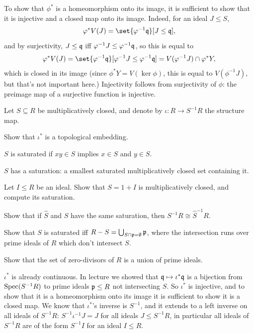     To show that $\phi^*$ is a homeomorphism onto its image, it is sufficient to show that it is injective and a closed map onto its image.
    Indeed, for an ideal $J\leq S$,
    $$ \phi^*V(J) = \set{\phi^{-1}\q}[J\leq\q] , $$
    and by surjectivity, $J\leq{{\frak q}}$ iff $\varphi^{-1}J\leq \varphi^{-1}{{\frak q}}$, so this is equal to
    $$ \phi^*V(J) = \set{\phi^{-1}\q}[\phi^{-1}J\leq\phi^{-1}\q] = V(\phi^{-1}J) \cap \phi^*Y , $$
    which is closed in its image (since $\phi^*Y=V(\ker\phi)$, this is equal to $V(\phi^{-1}J)$, but that's not important here.)
    Injectivity follows from surjectivity of $\phi$: the preimage map of a surjective function is injective.
\eenum

\bprob

    Let $S\subseteq R$ be multiplicatively closed, and denote by $\iota\colon R\to S^{-1}R$ the structure map.
    \benum
        \item Show that $\iota^*$ is a topological embedding.
        \item $S$ is {\emphcolor saturated} if $xy\in S$ implies $x\in S$ and $y\in S$.
        \benum
            \item $S$ has a {\emphcolor saturation}: a smallest saturated multiplicatively closed set containing it.
            \item Let $I\leq R$ be an ideal.
            Show that $S=1+I$ is multiplicatively closed, and compute its saturation.
            \item Show that if $\hat S$ and $S$ have the same saturation, then $S^{-1}R\cong\hat S^{-1}R$.
            \item Show that $S$ is saturated iff $R-S=\bigcup_{S\cap{{\frak p}}=\emptyset}{{\frak p}}$, where the intersection runs over prime ideals of $R$
            which don't intersect $S$.
            \item Show that the set of zero-divisors of $R$ is a union of prime ideals.
        \eenum
    \eenum

\eprob

\benum
    \item $\iota^*$ is already continuous.
    In lecture we showed that ${{\frak q}}\mapsto\iota^*{{\frak q}}$ is a bijection from ${\rm Spec}(S^{-1}R)$ to prime ideals ${{\frak p}}\leq R$ not intersecting $S$.
    So $\iota^*$ is injective, and to show that it is a homeomorphism onto its image it is sufficient to show it is a closed map.
    We know that $\iota^*$'s inverse is $S^{-1}$, and it extends to a left inverse on all ideals of $S^{-1}R$: $S^{-1}\iota^{-1}J=J$ for all ideals
    $J\leq S^{-1}R$, in particular all ideals of $S^{-1}R$ are of the form $S^{-1}I$ for an ideal $I\leq R$.

